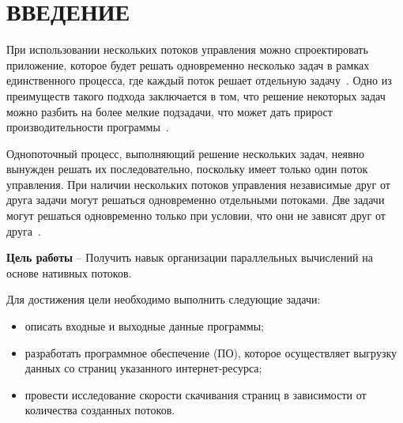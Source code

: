 \chapter*{ВВЕДЕНИЕ}

При использовании нескольких потоков управления можно спроектировать приложение, которое будет решать одновременно несколько задач в рамках единственного процесса, где каждый поток решает отдельную задачу~\cite{unix}. Одно из преимуществ такого подхода заключается в том, что решение некоторых задач можно разбить на более мелкие подзадачи, что может дать прирост производительности программы~\cite{unix}. 

Однопоточный процесс, выполняющий решение нескольких задач, неявно вынужден решать их последовательно, поскольку имеет только один поток управления. При наличии нескольких потоков управления независимые друг от друга задачи могут решаться одновременно отдельными потоками. Две задачи могут решаться одновременно только при условии, что они не зависят друг от друга~\cite{unix}.

\textbf{Цель работы} -- Получить навык организации параллельных вычислений на основе нативных потоков. 

Для достижения цели необходимо выполнить следующие задачи:
\begin{itemize}[label=--]
    \item описать входные и выходные данные программы;
    \item разработать программное обеспечение (ПО), которое осуществляет выгрузку данных со страниц указанного интернет-ресурса;
    \item провести исследование скорости скачивания страниц в зависимости от количества созданных потоков. 
\end{itemize}
